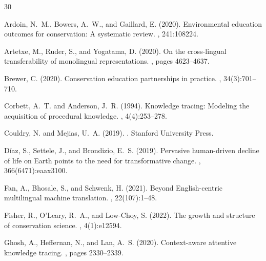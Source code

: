 \documentclass[11pt,a4paper]{article}
\begin{document}
\begin{thebibliography}{30}

Ardoin, N.~M., Bowers, A.~W., and Gaillard, E. (2020).
\newblock Environmental education outcomes for conservation: A systematic review.
, 241:108224.

Artetxe, M., Ruder, S., and Yogatama, D. (2020).
\newblock On the cross-lingual transferability of monolingual representations.
, pages 4623--4637.

Brewer, C. (2020).
\newblock Conservation education partnerships in practice.
, 34(3):701--710.

Corbett, A.~T. and Anderson, J.~R. (1994).
\newblock Knowledge tracing: Modeling the acquisition of procedural knowledge.
, 4(4):253--278.

Couldry, N. and Mejias, U.~A. (2019).
.
\newblock Stanford University Press.

D\'{i}az, S., Settele, J., and Brondizio, E.~S. (2019).
\newblock Pervasive human-driven decline of life on Earth points to the need for transformative change.
, 366(6471):eaax3100.

Fan, A., Bhosale, S., and Schwenk, H. (2021).
\newblock Beyond English-centric multilingual machine translation.
, 22(107):1--48.

Fisher, R., O'Leary, R.~A., and Low-Choy, S. (2022).
\newblock The growth and structure of conservation science.
, 4(1):e12594.

Ghosh, A., Heffernan, N., and Lan, A.~S. (2020).
\newblock Context-aware attentive knowledge tracing.
, pages 2330--2339.


\end{thebibliography}
\end{document}
